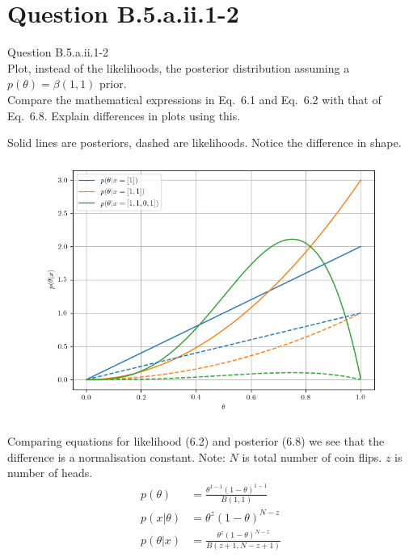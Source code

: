 \documentclass[usenames,dvipsnames,table]{beamer}
\begin{document}
\section{Question B.5.a.ii.1-2}
\begin{frame}
\begin{center}
{\huge{Question B.5.a.ii.1-2}}
\\\vspace{2em}
Plot, instead of the likelihoods, the posterior distribution assuming a $p(\theta)=\beta(1,1)$ prior.
\\\vspace{1em}
Compare the mathematical expressions in Eq.~6.1 and Eq.~6.2 with that of Eq.~6.8. Explain differences in plots using this.
\end{center}
\end{frame}

\begin{frame}
Solid lines are posteriors, dashed are likelihoods. Notice the difference in shape.
\begin{figure}
\centering
\includegraphics[height=0.8\textheight]{img/ex3B5aii1.png}
\end{figure}
\end{frame}

\begin{frame}
Comparing equations for likelihood (6.2) and posterior (6.8) we see that the difference is a normalisation constant. Note: $N$ is total number of coin flips. $z$ is number of heads.
\begin{align*}
p(\theta) &= \frac{\theta^{1-1}(1-\theta)^{1-1}}{B(1, 1)}\tag{6.3}\\
p(x|\theta) &= \theta^z(1-\theta)^{N-z}\tag{6.2}\\
p(\theta|x) &= \frac{\theta^{z}(1-\theta)^{N-z}}{B(z+1, N-z+1)}\tag{6.8}
\end{align*}
\end{frame}
\end{document}
